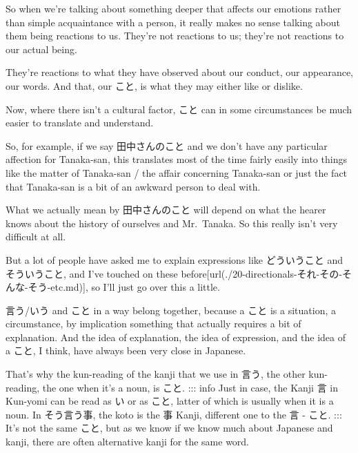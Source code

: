 So when we're talking about something deeper that affects our emotions rather than simple acquaintance with a person, it really makes no sense talking about them being reactions to us. They're not reactions to us; they're not reactions to our actual being.

They're reactions to what they have observed about our conduct, our appearance, our words. And that, our こと, is what they may either like or dislike.

Now, where there isn't a cultural factor, こと can in some circumstances be much easier to translate and understand.

{}

So, for example, if we say 田中さんのこと and we don't have any particular affection for Tanaka-san, this translates most of the time fairly easily into things like the matter of Tanaka-san / the affair concerning Tanaka-san or just the fact that Tanaka-san is a bit of an awkward person to deal with.

What we actually mean by 田中さんのこと will depend on what the hearer knows about the history of ourselves and Mr.~Tanaka. So this really isn't very difficult at all.

\stopsectionlevel

\startsectionlevel[title={どういうこと, そういうこと & ということ},reference={どういうこと-そういうこと-ということ}]

But a lot of people have asked me to explain expressions like どういうこと and そういうこと, and I've touched on these before\goto{{[}20{]}}[url(./20-directionals-それ-その-そんな-そう-etc.md)], so I'll just go over this a little.

{}

言う/いう and こと in a way belong together, because a こと is a situation, a circumstance, by implication something that actually requires a bit of explanation. And the idea of explanation, the idea of expression, and the idea of a こと, I think, have always been very close in Japanese.

That's why the kun-reading of the kanji that we use in 言う, the other kun-reading, the one when it's a noun, is こと. ::: info Just in case, the Kanji 言 in Kun-yomi can be read as い or as こと, latter of which is usually when it is a noun. In そう言う事, the koto is the 事 Kanji, different one to the 言 - こと. ::: It's not the same こと, but as we know if we know much about Japanese and kanji, there are often alternative kanji for the same word.

